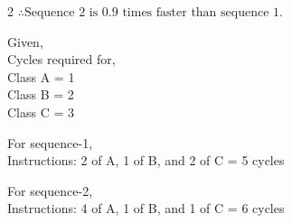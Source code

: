 \begin{multicols}{2}
   \vspace{0.5em}
   $\therefore \text{Sequence 2 is 0.9 times faster than sequence 1.}$

   \columnbreak
   Given,\\[0.5em]
   Cycles required for,\\
   Class A = 1\\
   Class B = 2\\
   Class C = 3

   For sequence-1,\\
   Instructions: 2 of A, 1 of B, and 2 of C = 5 cycles

   For sequence-2,\\
   Instructions: 4 of A, 1 of B, and 1 of C = 6 cycles
\end{multicols}
